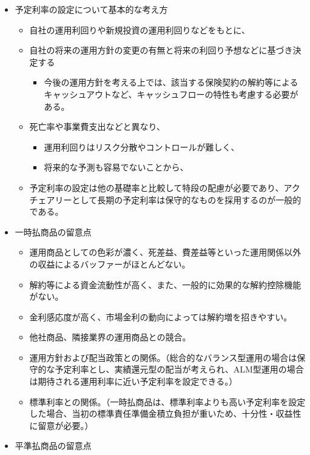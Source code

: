 \documentclass[
]{article}
\providecommand{\tightlist}{%
  \setlength{\itemsep}{0pt}\setlength{\parskip}{0pt}}
\begin{document}
\begin{itemize}
\tightlist
\item
  予定利率の設定について基本的な考え方

  \begin{itemize}
  \tightlist
  \item
    自社の運用利回りや新規投資の運用利回りなどをもとに、
  \item
    自社の将来の運用方針の変更の有無と将来の利回り予想などに基づき決定する

    \begin{itemize}
    \tightlist
    \item
      今後の運用方針を考える上では、該当する保険契約の解約等によるキャッシュアウトなど、キャッシュフローの特性も考慮する必要がある。
    \end{itemize}
  \item
    死亡率や事業費支出などと異なり、

    \begin{itemize}
    \tightlist
    \item
      運用利回りはリスク分散やコントロールが難しく、
    \item
      将来的な予測も容易でないことから、
    \end{itemize}
  \item
    予定利率の設定は他の基礎率と比較して特段の配慮が必要であり、アクチェアリーとして長期の予定利率は保守的なものを採用するのが一般的である。
  \end{itemize}
\item
  一時払商品の留意点

  \begin{itemize}
  \tightlist
  \item
    運用商品としての色彩が濃く、死差益、費差益等といった運用関係以外の収益によるバッファーがほとんどない。
  \item
    解約等による資金流動性が高く、また、一般的に効果的な解約控除機能がない。
  \item
    金利感応度が高く、市場金利の動向によっては解約増を招きやすい。
  \item
    他社商品、隣接業界の運用商品との競合。
  \item
    運用方針および配当政策との関係。（総合的なバランス型運用の場合は保守的な予定利率とし、実績還元型の配当が考えられ、ALM型運用の場合は期待される運用利率に近い予定利率を設定できる。）
  \item
    標準利率との関係。（一時払商品は、標準利率よりも高い予定利率を設定した場合、当初の標準責任準備金積立負担が重いため、十分性・収益性に留意が必要。）
  \end{itemize}
\item
  平準払商品の留意点


\end{itemize}
\end{document}
